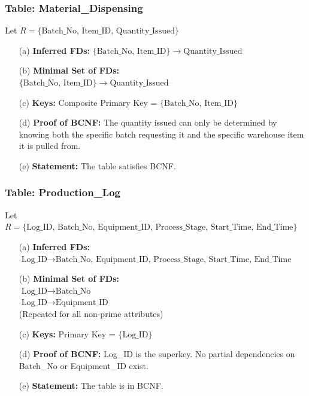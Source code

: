 \documentclass[12pt, a4paper]{article}
\begin{document}
\subsubsection{Table: Material\_Dispensing}
Let $R = \{ \text{Batch\_No, Item\_ID, Quantity\_Issued} \}$
\begin{enumerate}
    \item[(a)] \textbf{Inferred FDs:} $\{ \text{Batch\_No, Item\_ID} \} \rightarrow \text{Quantity\_Issued}$
    \item[(b)] \textbf{Minimal Set of FDs:} 
    \\ $\{ \text{Batch\_No, Item\_ID} \} \rightarrow \text{Quantity\_Issued}$
    \item[(c)] \textbf{Keys:} Composite Primary Key = $\{ \text{Batch\_No, Item\_ID} \}$
    \item[(d)] \textbf{Proof of BCNF:} The quantity issued can only be determined by knowing both the specific batch requesting it and the specific warehouse item it is pulled from.
    \item[(e)] \textbf{Statement:} The table satisfies BCNF.
\end{enumerate}

\subsubsection{Table: Production\_Log}
Let $R = \{ \text{Log\_ID, Batch\_No, Equipment\_ID, Process\_Stage, Start\_Time, End\_Time} \}$
\begin{enumerate}
    \item[(a)] \textbf{Inferred FDs:} $\text{Log\_ID} \rightarrow \text{Batch\_No, Equipment\_ID, Process\_Stage, Start\_Time, End\_Time}$
    \item[(b)] \textbf{Minimal Set of FDs:} 
    \\ $\text{Log\_ID} \rightarrow \text{Batch\_No}$
    \\ $\text{Log\_ID} \rightarrow \text{Equipment\_ID}$
    \\ (Repeated for all non-prime attributes)
    \item[(c)] \textbf{Keys:} Primary Key = $\{ \text{Log\_ID} \}$
    \item[(d)] \textbf{Proof of BCNF:} Log\_ID is the superkey. No partial dependencies on Batch\_No or Equipment\_ID exist.
    \item[(e)] \textbf{Statement:} The table is in BCNF.
\end{enumerate}

\end{document}
